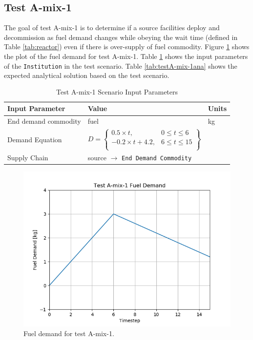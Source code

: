 \documentclass[11pt,letterpaper]{article}
\begin{document}
\subsection{Test A-mix-1}
The goal of test A-mix-1 is to determine if a source facilities deploy and decommission as fuel demand changes while obeying the wait time (defined in Table \ref{tab:reactor}) even if there is over-supply of fuel commodity. Figure \ref{fig:A-mix-1} shows the plot of the fuel demand for test A-mix-1. 
Table \ref{tab:testA-mix-1} shows the input parameters of the \texttt{Institution} in the test scenario. Table \ref{tab:testA-mix-1ana} shows the expected analytical solution based on the test scenario. 

\begin{table}[H]
	\centering
	\caption{Test A-mix-1 Scenario Input Parameters }
	\label{tab:testA-mix-1}
	\begin{tabular}{|l|l|l|}
		\hline
		\textbf{Input Parameter} & \textbf{Value} & \textbf{Units} \\
		\hline
		End demand commodity & fuel & kg \\
		Demand Equation & $D = \left\{
		\begin{array}{ll}
		0.5 \times t , & 0 \leq t \leq  6 \\
		-0.2 \times t +4.2 , &  6 \leq t \leq  15  \\
		\end{array}\right\}$
		& \\
		Supply Chain & source $\rightarrow$ \texttt{End Demand Commodity} &  \\
		\hline
	\end{tabular}
\end{table}

\begin{figure}[H]
	\begin{center}
		\includegraphics[scale=0.7]{./images/A-mix-1.png}
	\end{center}
	\caption{Fuel demand for test A-mix-1.}
	\label{fig:A-mix-1}
\end{figure}
\end{document}
